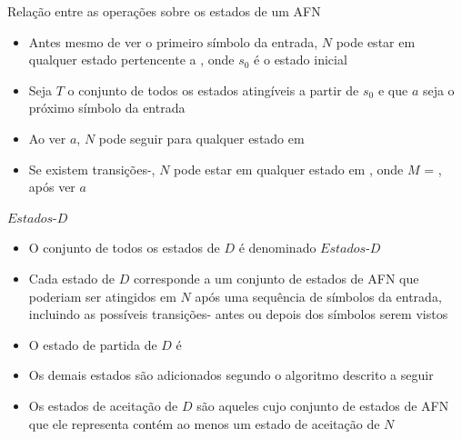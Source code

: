 \begin{frame}[fragile]{Relação entre as operações sobre os estados de um AFN}

    \begin{itemize}
        \item Antes mesmo de ver o primeiro símbolo da entrada, $N$ pode estar em qualquer estado pertencente a , onde $s_0$
            é o estado inicial
        \pause

        \item Seja $T$ o conjunto de todos os estados atingíveis a partir de $s_0$ e que $a$ seja o próximo símbolo da entrada
        \pause

        \item Ao ver $a$, $N$ pode seguir para qualquer estado em 
        \pause

        \item Se existem transições-, $N$ pode estar em qualquer estado em , onde $M$ = , após ver $a$

    \end{itemize}

\end{frame}

\begin{frame}[fragile]{$Estados$-$D$}

    \begin{itemize}
        \item O conjunto de todos os estados de $D$ é denominado $Estados$-$D$
        \pause

        \item Cada estado de $D$ corresponde a um conjunto de estados de AFN que poderiam ser atingidos em $N$ após uma sequência de símbolos da entrada, incluindo
            as possíveis transições- antes ou depois dos símbolos serem vistos
        \pause

        \item O estado de partida de $D$ é 
        \pause

        \item Os demais estados são adicionados segundo o algoritmo descrito a seguir
        \pause

        \item Os estados de aceitação de $D$ são aqueles cujo conjunto de estados de AFN que ele representa contém ao menos um estado de aceitação de $N$
    \end{itemize}

\end{frame}

